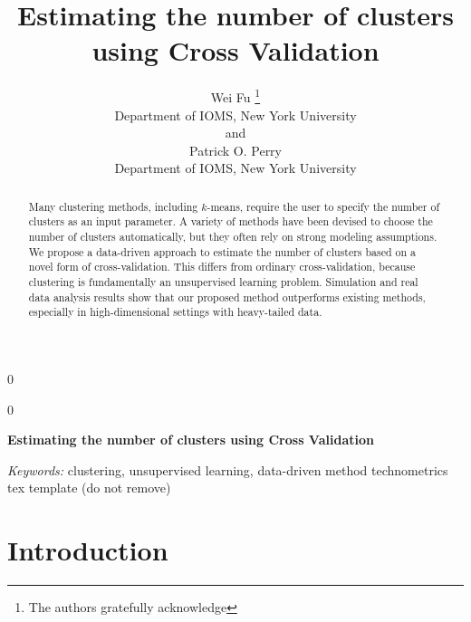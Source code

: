 \documentclass[12pt]{article}
\newcommand{\blind}{0}
\begin{document}
%

\def\spacingset#1{\renewcommand{\baselinestretch}%
{#1}\small\normalsize} \spacingset{1}



\blind
{
  \title{\bf Estimating the number of clusters using Cross Validation}
  \author{Wei Fu \thanks{
    The authors gratefully acknowledge}\hspace{.2cm}\\
    Department of IOMS, New York University\\
    and \\
    Patrick O. Perry \\
    Department of IOMS, New York University}
  \maketitle
} \fi

\blind
{
  \bigskip
  \bigskip
  \bigskip
  \begin{center}
    {\LARGE\bf Estimating the number of clusters using Cross Validation}
\end{center}
  \medskip
} \fi

\bigskip
\begin{abstract}
Many clustering methods, including $k$-means, require the user to specify the
number of clusters as an input parameter. A variety of methods have been
devised to choose the number of clusters automatically, but they often rely on
strong modeling assumptions. We propose a data-driven approach to estimate the
number of clusters based on a novel form of cross-validation. This differs
from ordinary cross-validation, because clustering is fundamentally an
unsupervised learning problem. Simulation and real data analysis results show
that our proposed method outperforms existing methods, especially in
high-dimensional settings with heavy-tailed data.
\end{abstract}

\noindent%
{\it Keywords:}  clustering, unsupervised learning, data-driven method 
\vfill
\hfill {\tiny technometrics tex template (do not remove)}

\newpage
\spacingset{1.45} %
\section{Introduction}
\label{sec:intro}
\end{document}
